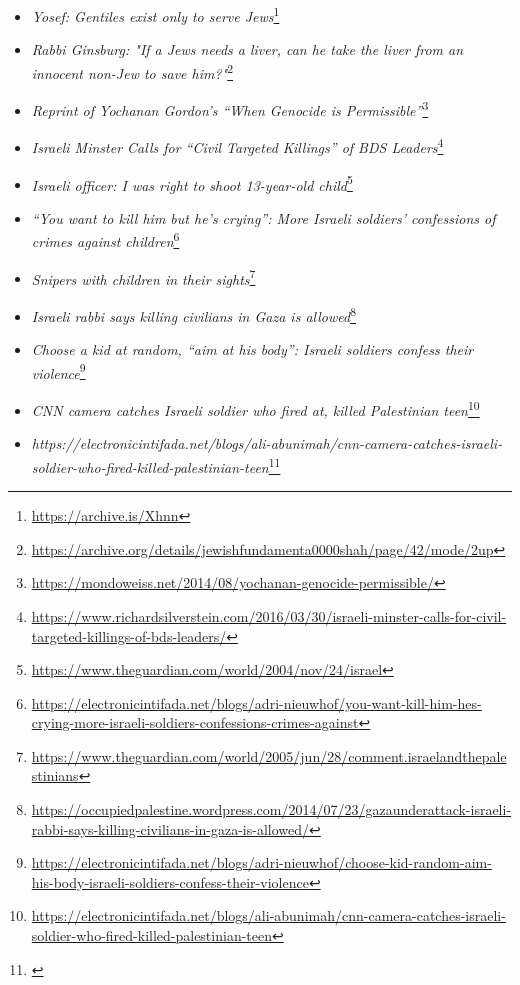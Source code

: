 \begin{itemize}
\item \textit{Yosef: Gentiles exist only to serve Jews}\footnote{\url{https://archive.is/Xhnn}}

\item \textit{Rabbi Ginsburg: "If a Jews needs a liver, can he take the liver from an innocent non-Jew to save him?"}\footnote{\url{https://archive.org/details/jewishfundamenta0000shah/page/42/mode/2up}}

\item \textit{Reprint of Yochanan Gordon’s “When Genocide is Permissible”}\footnote{\url{https://mondoweiss.net/2014/08/yochanan-genocide-permissible/}}

\item \textit{Israeli Minster Calls for “Civil Targeted Killings” of BDS Leaders}\footnote{\url{https://www.richardsilverstein.com/2016/03/30/israeli-minster-calls-for-civil-targeted-killings-of-bds-leaders/}}

\item \textit{Israeli officer: I was right to shoot 13-year-old child}\footnote{\url{https://www.theguardian.com/world/2004/nov/24/israel}}

\item \textit{“You want to kill him but he’s crying”: More Israeli soldiers’ confessions of crimes against children}\footnote{\url{https://electronicintifada.net/blogs/adri-nieuwhof/you-want-kill-him-hes-crying-more-israeli-soldiers-confessions-crimes-against}}

\item \textit{Snipers with children in their sights}\footnote{\url{https://www.theguardian.com/world/2005/jun/28/comment.israelandthepalestinians}}

\item \textit{Israeli rabbi says killing civilians in Gaza is allowed}\footnote{\url{https://occupiedpalestine.wordpress.com/2014/07/23/gazaunderattack-israeli-rabbi-says-killing-civilians-in-gaza-is-allowed/}}

\item \textit{Choose a kid at random, “aim at his body”: Israeli soldiers confess their violence}\footnote{\url{https://electronicintifada.net/blogs/adri-nieuwhof/choose-kid-random-aim-his-body-israeli-soldiers-confess-their-violence}}

\item \textit{CNN camera catches Israeli soldier who fired at, killed Palestinian teen}\footnote{\url{https://electronicintifada.net/blogs/ali-abunimah/cnn-camera-catches-israeli-soldier-who-fired-killed-palestinian-teen}}

\item \textit{https://electronicintifada.net/blogs/ali-abunimah/cnn-camera-catches-israeli-soldier-who-fired-killed-palestinian-teen}\footnote{\url{}}

\end{itemize}


